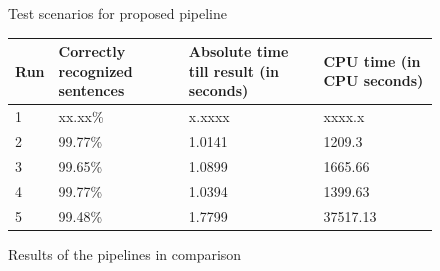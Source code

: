 \begin{figure}[ht]	
	\centering
	
	\caption{Test scenarios for proposed pipeline}
	\label{pic:eval_p3_5_diag}
\end{figure}

\begin{figure}[ht]
	\begin{tabular}{ | l | p{} | p{} | p{} |}
		\hline
		Run & Correctly recognized sentences & Absolute time till result (in seconds) & CPU time (in CPU seconds) \\ \hline
		1 & xx.xx\% & x.xxxx & xxxx.x \\ \hline
		2 & 99.77\% & 1.0141 & 1209.3 \\ \hline
		3 & 99.65\% & 1.0899 & 1665.66 \\ \hline
		4 & 99.77\% & 1.0394 & 1399.63 \\ \hline
		5 & 99.48\% & 1.7799 & 37517.13 \\ \hline
	\end{tabular}
	\caption{Results of the pipelines in comparison}
	\label{pic:eval_dataset_results}
\end{figure}


